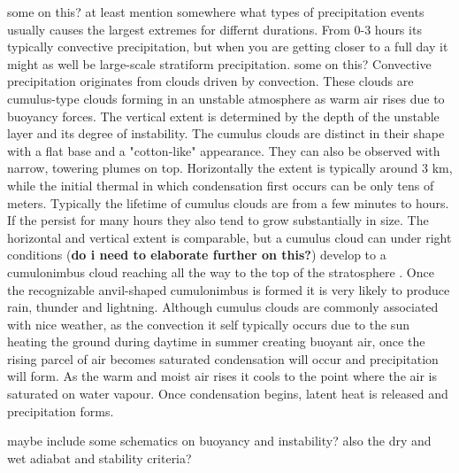 some on this? at least mention somewhere what types of precipitation events usually causes the largest extremes for differnt durations. From 0-3 hours its typically convective precipitation, but when you are getting closer to a full day it might as well be large-scale stratiform precipitation. 
some on this?
Convective precipitation originates from clouds driven by convection. These clouds are cumulus-type clouds forming in an unstable atmosphere as warm air rises due to buoyancy forces. The vertical extent is determined by the depth of the unstable layer and its degree of instability. The cumulus clouds are distinct in their shape with a flat base and a "cotton-like" appearance. They can also be observed with narrow, towering plumes on top. Horizontally the extent is typically around 3 km, while the initial thermal in which condensation first occurs can be only tens of meters. Typically the lifetime of cumulus clouds are from a few minutes to hours. If the persist for many hours they also tend to grow substantially in size. The horizontal and vertical extent is comparable, but a cumulus cloud can under right conditions (\textbf{do i need to elaborate further on this?}) develop to a cumulonimbus cloud reaching all the way to the top of the stratosphere \cite{rogers}. Once the recognizable anvil-shaped cumulonimbus is formed it is very likely to produce rain, thunder and lightning. Although cumulus clouds are commonly associated with nice weather, as the convection it self typically occurs due to the sun heating the ground during daytime in summer creating buoyant air, once the rising parcel of air becomes saturated condensation will occur and precipitation will form. As the warm and moist air rises it cools to the point where the air is saturated on water vapour. Once condensation begins, latent heat is released and precipitation forms.

maybe include some schematics on buoyancy and instability? also the dry and wet adiabat and stability criteria? 

